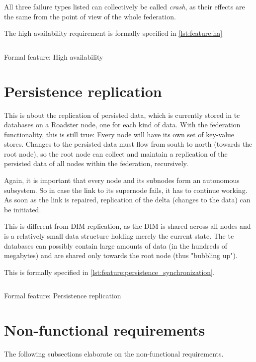All three failure types listed can collectively be called \emph{crash},
as their effects are the same from the point of view of the whole federation.

The high availability requirement is formally specified in \autoref{lst:feature:ha}

\begin{listing}
	\inputminted{Gherkin}{listings/features/high_availability.feature}
	\caption{Formal feature: High availability}
	\label{lst:feature:ha}
\end{listing}

\section{Persistence replication}
This is about the replication of persisted data, which is currently stored
in \gls{tc} databases on a Roadster node, one for each kind of data. With the federation functionality, this is
still true: Every node will have its own set of key-value stores. Changes to the persisted
data must flow from south to north (towards the root node), so the root
node can collect and maintain a replication of the persisted data of all
nodes within the federation, recursively.

Again, it is important that every node and its subnodes form an autonomous subsystem. So
in case the link to its supernode fails, it has to continue working. As soon as
the link is repaired, replication of the delta (changes to the data) can
be initiated.

This is different from \gls{DIM} replication, as the DIM is shared across
all nodes and is a relatively small data structure holding merely the current state. The \gls{tc} databases
can possibly contain large amounts of data (in the hundreds of megabytes) and
are shared only towards the root node (thus "bubbling up").

This is formally specified in \autoref{lst:feature:persistence_synchronization}.

\begin{listing}
	\inputminted{Gherkin}{listings/features/persistence_synchronization.feature}
	\caption{Formal feature: Persistence replication}
	\label{lst:feature:persistence_synchronization}
\end{listing}

\section{Non-functional requirements}\label{sec:nfr}
The following subsections elaborate on the non-functional requirements.

